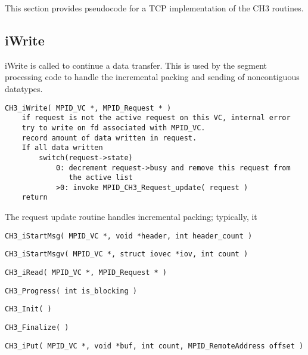 \documentclass{article}
\begin{document}
This section provides pseudocode for a TCP implementation of the CH3
routines.

\subsection{iWrite}
iWrite is called to continue a data transfer.  This is used by the
segment processing code to handle the incremental packing and sending
of noncontiguous datatypes.

\begin{verbatim}
CH3_iWrite( MPID_VC *, MPID_Request * )
    if request is not the active request on this VC, internal error
    try to write on fd associated with MPID_VC.  
    record amount of data written in request.
    If all data written
        switch(request->state)
            0: decrement request->busy and remove this request from
               the active list
            >0: invoke MPID_CH3_Request_update( request )
    return
\end{verbatim}
The request update routine handles incremental packing; typically, it

\begin{verbatim}
CH3_iStartMsg( MPID_VC *, void *header, int header_count )
\end{verbatim}

\begin{verbatim}
CH3_iStartMsgv( MPID_VC *, struct iovec *iov, int count )
\end{verbatim}

\begin{verbatim}
CH3_iRead( MPID_VC *, MPID_Request * )
\end{verbatim}

\begin{verbatim}
CH3_Progress( int is_blocking )
\end{verbatim}

\begin{verbatim}
CH3_Init( )
\end{verbatim}

\begin{verbatim}
CH3_Finalize( )
\end{verbatim}

\begin{verbatim}
CH3_iPut( MPID_VC *, void *buf, int count, MPID_RemoteAddress offset )
\end{verbatim}
\end{document}
